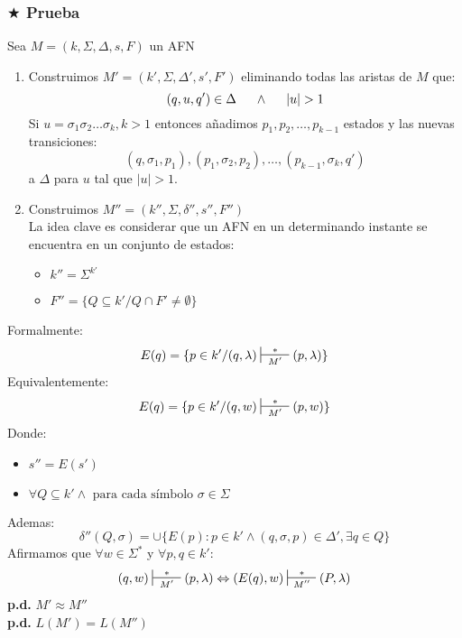 \subsubsection{$\bigstar$ Prueba}
Sea $M=(k,\Sigma,\Delta,s,F)$ un AFN
\renewcommand{\labelenumi}{\theenumi}
\renewcommand{\theenumi}{\textbf{\roman{enumi}.)}}
\begin{enumerate}
\item Construimos $M' = (k',\Sigma,\Delta',s',F')$ eliminando todas las aristas de $M$ que:
$$
(q,u,q')\in \Delta \hspace{0.5cm}\wedge\hspace{0.5cm} |u|>1
$$
Si $u=\sigma_1\sigma_2\ldots\sigma_k, k>1$ entonces añadimos $p_1,p_2,\ldots,p_{k-1}$ estados y las nuevas transiciones:
$$
(q,\sigma_1,p_1),(p_1,\sigma_2,p_2),\ldots,(p_{k-1},\sigma_k,q')
$$
a $\Delta$ para $u$ tal que $|u|>1$.
\item Construimos $M''=(k'',\Sigma,\delta'',s'',F'')$\\
La idea clave es considerar que un AFN en un determinando instante se encuentra en un conjunto de estados:
\begin{itemize}
\item $k'' = \Sigma^{k'}$
\item $F''=\{ Q \subseteq k' / Q \cap F' \neq \emptyset \}$
\end{itemize}
\end{enumerate}
Formalmente:
$$
E(q)=\{p\in k' / (q,\lambda)\sststile{M'}{\hspace{0.25cm} * \hspace{0.25cm}} (p,\lambda) \}
$$
Equivalentemente:
$$
E(q)=\{p\in k' / (q,w)\sststile{M'}{\hspace{0.25cm} * \hspace{0.25cm}} (p,w) \}
$$
Donde:
\begin{itemize}
\item $s'' = E(s')$
\item $\forall Q\subseteq k' \wedge \text{ para cada símbolo }\sigma \in \Sigma$
\end{itemize}
Ademas:
$$
\delta''(Q,\sigma)=\cup \{ E(p): p\in k' \wedge (q,\sigma,p)\in\Delta', \exists q\in Q \}
$$
Afirmamos que $\forall w\in\Sigma^*$ y $\forall p,q\in k'$:
$$
(q,w)\sststile{M'}{\hspace{0.25cm} * \hspace{0.25cm}}(p,\lambda)\Leftrightarrow (E(q),w) \sststile{M''}{\hspace{0.25cm} * \hspace{0.25cm}} (P,\lambda)
$$
\textbf{p.d.} $M'\approx M''$ \\
\textbf{p.d.} $L(M')=L(M'')$

